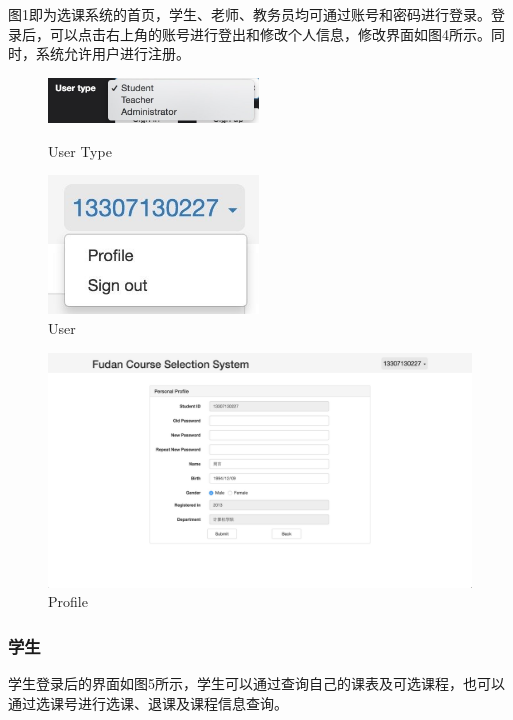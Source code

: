 \documentclass[a4paper, 11pt, nofonts, nocap, fancyhdr]{ctexart}
\begin{document}
	图1即为选课系统的首页，学生、老师、教务员均可通过账号和密码进行登录。登录后，可以点击右上角的账号进行登出和修改个人信息，修改界面如图4所示。同时，系统允许用户进行注册。

	\begin{figure}[ht]
		\begin{minipage}{0.5\textwidth}
			\centering
			\includegraphics[width=2.2in]{usertype}
			\caption{User Type}
		\end{minipage}%
		\begin{minipage}{0.5\textwidth}
			\centering
			\includegraphics[width=2.2in]{user}
			\caption{User}
		\end{minipage}
	\end{figure}

	\begin{figure}[h]
		\centering
		\includegraphics[width=6in]{stupro}
		\caption{Profile}
	\end{figure}

\newpage
\subsubsection{学生}

	学生登录后的界面如图5所示，学生可以通过查询自己的课表及可选课程，也可以通过选课号进行选课、退课及课程信息查询。
\end{document}
